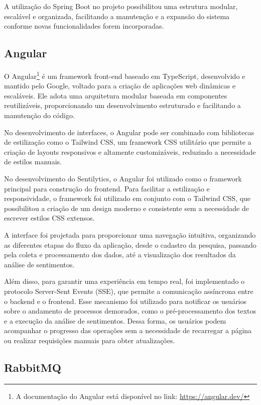 \documentclass[
	12pt,				%
	oneside,			%
	a4paper,			%
	english,			%
	french,				%
	spanish,			%
	brazil				%
	]{abntex2}
\begin{document}
A utilização do Spring Boot no projeto possibilitou uma estrutura
modular, escalável e organizada, facilitando a manutenção e a expansão
do sistema conforme novas funcionalidades forem incorporadas.

\hypertarget{angular}{%
\subsection{Angular}\label{angular}}

O Angular\footnote{A documentação do Angular está disponível no link:
  \url{https://angular.dev/}} é um framework front-end baseado em
TypeScript, desenvolvido e mantido pelo Google, voltado para a criação
de aplicações web dinâmicas e escaláveis. Ele adota uma arquitetura
modular baseada em componentes reutilizáveis, proporcionando um
desenvolvimento estruturado e facilitando a manutenção do código.

No desenvolvimento de interfaces, o Angular pode ser combinado com
bibliotecas de estilização como o Tailwind CSS, um framework CSS
utilitário que permite a criação de layouts responsivos e altamente
customizáveis, reduzindo a necessidade de estilos manuais.

No desenvolvimento do Sentilytics, o Angular foi utilizado como o
framework principal para construção do frontend. Para facilitar a
estilização e responsividade, o framework foi utilizado em conjunto com
o Tailwind CSS, que possibilitou a criação de um design moderno e
consistente sem a necessidade de escrever estilos CSS extensos.

A interface foi projetada para proporcionar uma navegação intuitiva,
organizando as diferentes etapas do fluxo da aplicação, desde o cadastro
da pesquisa, passando pela coleta e processamento dos dados, até a
visualização dos resultados da análise de sentimentos.

Além disso, para garantir uma experiência em tempo real, foi
implementado o protocolo Server-Sent Events (SSE), que permite a
comunicação assíncrona entre o backend e o frontend. Esse mecanismo foi
utilizado para notificar os usuários sobre o andamento de processos
demorados, como o pré-processamento dos textos e a execução da análise
de sentimentos. Dessa forma, os usuários podem acompanhar o progresso
das operações sem a necessidade de recarregar a página ou realizar
requisições manuais para obter atualizações.

\hypertarget{rabbitmq}{%
\subsection{RabbitMQ}\label{rabbitmq}}
\end{document}
